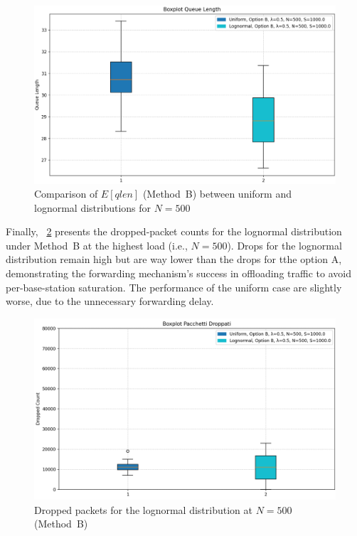 \documentclass{report}
\begin{document}
\begin{figure}[H]
    \centering
    \includegraphics[width=\textwidth]{img/plots/N-vary/Q_B_N500.png}
    \caption{Comparison of \(E[qlen]\) (Method~B) between uniform and lognormal distributions for \(N = 500\)}
    \label{fig:Q_B_N500}
\end{figure}

\begin{flushleft}
Finally, \figurename~\ref{fig:D_Box_Log_B_N500} presents the dropped-packet counts for the lognormal distribution under Method~B at the highest load (i.e., \(N = 500\)). Drops for the lognormal distribution remain high but are way lower than the drops for tthe option A, demonstrating the forwarding mechanism’s success in offloading traffic to avoid per-base-station saturation.
The performance of the uniform case are slightly worse, due to the unnecessary forwarding delay.
\end{flushleft}

\begin{figure}[H]
    \centering
    \includegraphics[width=\textwidth]{img/plots/N-vary/D_Box_Log_B_N500.png}
    \caption{Dropped packets for the lognormal distribution at \(N = 500\) (Method~B)}
    \label{fig:D_Box_Log_B_N500}
\end{figure}
\end{document}
